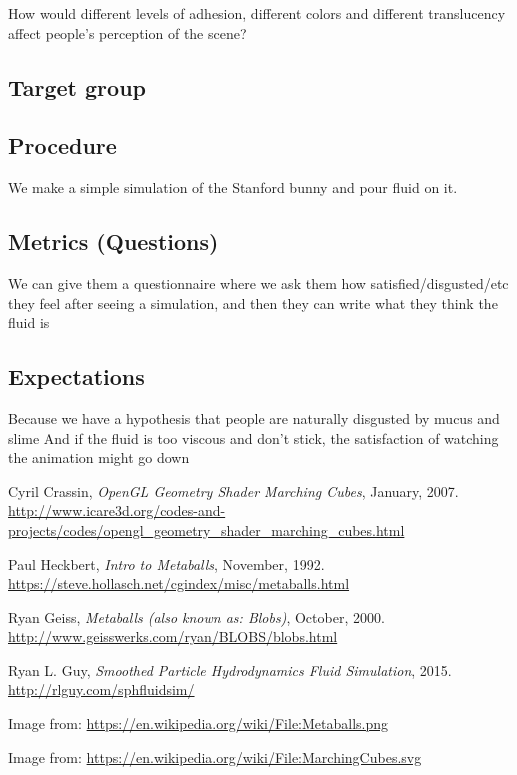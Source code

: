 \documentclass{article}
\begin{document}
\begin{multicols}{2}
            How would different levels of adhesion, different colors and different translucency affect people's perception of the scene?

        \subsection{Target group}

        \subsection{Procedure}

            We make a simple simulation of the Stanford bunny and pour fluid on it.

        \subsection{Metrics (Questions)}

            We can give them a questionnaire where we ask them how satisfied/disgusted/etc they feel after seeing a simulation, and then they can write what they think the fluid is

        \subsection{Expectations}

            Because we have a hypothesis that people are naturally disgusted by mucus and slime
            And if the fluid is too viscous and don't stick, the satisfaction of watching the animation might go down

	\end{multicols}

\begin{thebibliography}{9}

	Cyril Crassin,
	\textit{OpenGL Geometry Shader Marching Cubes},
	January,
	2007.
	\\
	\url{http://www.icare3d.org/codes-and-projects/codes/opengl_geometry_shader_marching_cubes.html}

	Paul Heckbert,
	\textit{Intro to Metaballs},
	November,
	1992.
	\\
	\url{https://steve.hollasch.net/cgindex/misc/metaballs.html}
	
	Ryan Geiss,
	\textit{Metaballs (also known as: Blobs)},
	October,
	2000.
	\\
	\url{http://www.geisswerks.com/ryan/BLOBS/blobs.html}

	Ryan L. Guy,
	\textit{Smoothed Particle Hydrodynamics Fluid Simulation},
	2015.
	\\
	\url{http://rlguy.com/sphfluidsim/}

	Image from: \url{https://en.wikipedia.org/wiki/File:Metaballs.png}

  Image from: \url{https://en.wikipedia.org/wiki/File:MarchingCubes.svg}

\end{thebibliography}
\end{document}
